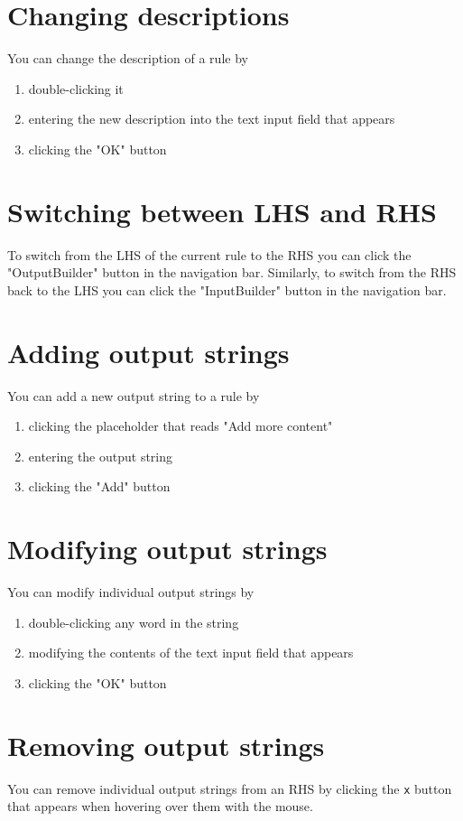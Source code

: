 \documentclass[11pt]{article}
\begin{document}
\section{Changing descriptions}
\label{sec-6}
You can change the description of a rule by

\begin{enumerate}
\item double-clicking it
\item entering the new description into the text input field that
appears
\item clicking the "OK" button
\end{enumerate}

\section{Switching between LHS and RHS}
\label{sec-7}
To switch from the LHS of the current rule to the RHS you can click
the "OutputBuilder" button in the navigation bar. Similarly, to
switch from the RHS back to the LHS you can click the "InputBuilder"
button in the navigation bar.

\section{Adding output strings}
\label{sec-8}
You can add a new output string to a rule by

\begin{enumerate}
\item clicking the placeholder that reads "Add more content"
\item entering the output string
\item clicking the "Add" button
\end{enumerate}

\section{Modifying output strings}
\label{sec-9}
You can modify individual output strings by

\begin{enumerate}
\item double-clicking any word in the string
\item modifying the contents of the text input field that appears
\item clicking the "OK" button
\end{enumerate}

\section{Removing output strings}
\label{sec-10}
You can remove individual output strings from an RHS by clicking the
\texttt{x} button that appears when hovering over them with the mouse.
\end{document}
